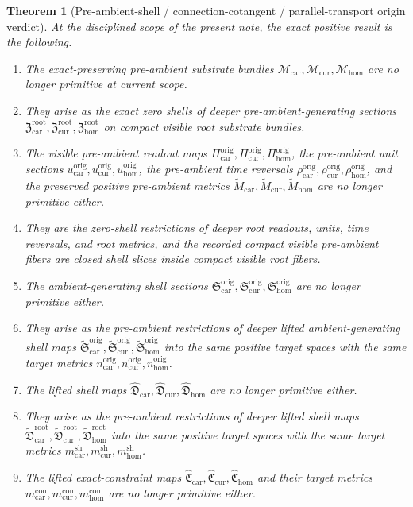 \documentclass[11pt]{article}
\newcommand{\TensorConstraintMetric}{m_{\mathrm{car}}^{\mathrm{con}}}
\newcommand{\CurConstraintMetric}{m_{\mathrm{cur}}^{\mathrm{con}}}
\newcommand{\HomConstraintMetric}{m_{\mathrm{hom}}^{\mathrm{con}}}
\newcommand{\TensorShellMetric}{m_{\mathrm{car}}^{\mathrm{sh}}}
\newcommand{\CurShellMetric}{m_{\mathrm{cur}}^{\mathrm{sh}}}
\newcommand{\HomShellMetric}{m_{\mathrm{hom}}^{\mathrm{sh}}}
\newcommand{\TensorOriginSpace}{\mathcal M_{\mathrm{car}}}
\newcommand{\CurOriginSpace}{\mathcal M_{\mathrm{cur}}}
\newcommand{\HomOriginSpace}{\mathcal M_{\mathrm{hom}}}
\newcommand{\TensorOriginRead}{\Pi_{\mathrm{car}}^{\mathrm{orig}}}
\newcommand{\CurOriginRead}{\Pi_{\mathrm{cur}}^{\mathrm{orig}}}
\newcommand{\HomOriginRead}{\Pi_{\mathrm{hom}}^{\mathrm{orig}}}
\newcommand{\TensorOriginUnit}{u_{\mathrm{car}}^{\mathrm{orig}}}
\newcommand{\CurOriginUnit}{u_{\mathrm{cur}}^{\mathrm{orig}}}
\newcommand{\HomOriginUnit}{u_{\mathrm{hom}}^{\mathrm{orig}}}
\newcommand{\TensorOriginTimeRev}{\rho_{\mathrm{car}}^{\mathrm{orig}}}
\newcommand{\CurOriginTimeRev}{\rho_{\mathrm{cur}}^{\mathrm{orig}}}
\newcommand{\HomOriginTimeRev}{\rho_{\mathrm{hom}}^{\mathrm{orig}}}
\newcommand{\TensorOriginSpaceMetric}{\widetilde M_{\mathrm{car}}}
\newcommand{\CurOriginSpaceMetric}{\widetilde M_{\mathrm{cur}}}
\newcommand{\HomOriginSpaceMetric}{\widetilde M_{\mathrm{hom}}}
\newcommand{\TensorOriginTargetMetric}{n_{\mathrm{car}}^{\mathrm{orig}}}
\newcommand{\CurOriginTargetMetric}{n_{\mathrm{cur}}^{\mathrm{orig}}}
\newcommand{\HomOriginTargetMetric}{n_{\mathrm{hom}}^{\mathrm{orig}}}
\newcommand{\TensorOriginSection}{\mathfrak S_{\mathrm{car}}^{\mathrm{orig}}}
\newcommand{\CurOriginSection}{\mathfrak S_{\mathrm{cur}}^{\mathrm{orig}}}
\newcommand{\HomOriginSection}{\mathfrak S_{\mathrm{hom}}^{\mathrm{orig}}}
\newcommand{\TensorLiftedShellSection}{\widehat{\mathfrak D}_{\mathrm{car}}}
\newcommand{\CurLiftedShellSection}{\widehat{\mathfrak D}_{\mathrm{cur}}}
\newcommand{\HomLiftedShellSection}{\widehat{\mathfrak D}_{\mathrm{hom}}}
\newcommand{\TensorOriginConstraintMap}{\widehat{\mathfrak C}_{\mathrm{car}}}
\newcommand{\CurOriginConstraintMap}{\widehat{\mathfrak C}_{\mathrm{cur}}}
\newcommand{\HomOriginConstraintMap}{\widehat{\mathfrak C}_{\mathrm{hom}}}
\newcommand{\TensorRootSection}{\mathfrak Z_{\mathrm{car}}^{\mathrm{root}}}
\newcommand{\CurRootSection}{\mathfrak Z_{\mathrm{cur}}^{\mathrm{root}}}
\newcommand{\HomRootSection}{\mathfrak Z_{\mathrm{hom}}^{\mathrm{root}}}
\newcommand{\TensorLiftedAmbientSection}{\widetilde{\mathfrak S}_{\mathrm{car}}^{\mathrm{orig}}}
\newcommand{\CurLiftedAmbientSection}{\widetilde{\mathfrak S}_{\mathrm{cur}}^{\mathrm{orig}}}
\newcommand{\HomLiftedAmbientSection}{\widetilde{\mathfrak S}_{\mathrm{hom}}^{\mathrm{orig}}}
\newcommand{\TensorRootLiftedShellSection}{\widetilde{\mathfrak D}_{\mathrm{car}}^{\mathrm{root}}}
\newcommand{\CurRootLiftedShellSection}{\widetilde{\mathfrak D}_{\mathrm{cur}}^{\mathrm{root}}}
\newcommand{\HomRootLiftedShellSection}{\widetilde{\mathfrak D}_{\mathrm{hom}}^{\mathrm{root}}}
\newtheorem{theorem}{Theorem}
\begin{document}
\begin{theorem}[Pre-ambient-shell / connection-cotangent / parallel-transport origin verdict]
\label{thm:verdict}
At the disciplined scope of the present note, the exact positive result is the following.
\begin{enumerate}
    \item The exact-preserving pre-ambient substrate bundles \(\TensorOriginSpace,\CurOriginSpace,\HomOriginSpace\) are no longer primitive at current scope.
    \item They arise as the exact zero shells of deeper pre-ambient-generating sections \(\TensorRootSection,\CurRootSection,\HomRootSection\) on compact visible root substrate bundles.
    \item The visible pre-ambient readout maps \(\TensorOriginRead,\CurOriginRead,\HomOriginRead\), the pre-ambient unit sections \(\TensorOriginUnit,\CurOriginUnit,\HomOriginUnit\), the pre-ambient time reversals \(\TensorOriginTimeRev,\CurOriginTimeRev,\HomOriginTimeRev\), and the preserved positive pre-ambient metrics \(\TensorOriginSpaceMetric,\CurOriginSpaceMetric,\HomOriginSpaceMetric\) are no longer primitive either.
    \item They are the zero-shell restrictions of deeper root readouts, units, time reversals, and root metrics, and the recorded compact visible pre-ambient fibers are closed shell slices inside compact visible root fibers.
    \item The ambient-generating shell sections \(\TensorOriginSection,\CurOriginSection,\HomOriginSection\) are no longer primitive either.
    \item They arise as the pre-ambient restrictions of deeper lifted ambient-generating shell maps \(\TensorLiftedAmbientSection,\CurLiftedAmbientSection,\HomLiftedAmbientSection\) into the same positive target spaces with the same target metrics \(\TensorOriginTargetMetric,\CurOriginTargetMetric,\HomOriginTargetMetric\).
    \item The lifted shell maps \(\TensorLiftedShellSection,\CurLiftedShellSection,\HomLiftedShellSection\) are no longer primitive either.
    \item They arise as the pre-ambient restrictions of deeper lifted shell maps \(\TensorRootLiftedShellSection,\CurRootLiftedShellSection,\HomRootLiftedShellSection\) into the same positive target spaces with the same target metrics \(\TensorShellMetric,\CurShellMetric,\HomShellMetric\).
    \item The lifted exact-constraint maps \(\TensorOriginConstraintMap,\CurOriginConstraintMap,\HomOriginConstraintMap\) and their target metrics \(\TensorConstraintMetric,\CurConstraintMetric,\HomConstraintMetric\) are no longer primitive either.

\end{enumerate}
\end{theorem}
\end{document}
